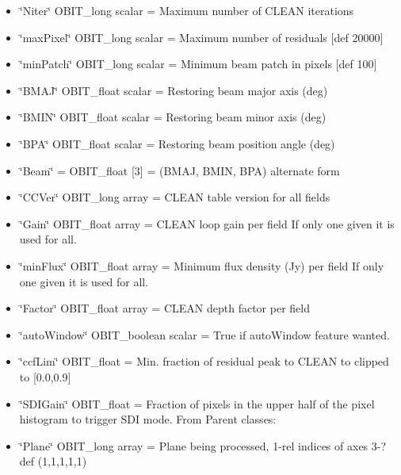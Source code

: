 \begin{itemize}
\item \char`\"{}Niter\char`\"{} OBIT\_\-long scalar = Maximum number of CLEAN iterations \item \char`\"{}max\-Pixel\char`\"{} OBIT\_\-long scalar = Maximum number of residuals [def 20000] \item \char`\"{}min\-Patch\char`\"{} OBIT\_\-long scalar = Minimum beam patch in pixels [def 100] \item \char`\"{}BMAJ\char`\"{} OBIT\_\-float scalar = Restoring beam major axis (deg) \item \char`\"{}BMIN\char`\"{} OBIT\_\-float scalar = Restoring beam minor axis (deg) \item \char`\"{}BPA\char`\"{} OBIT\_\-float scalar = Restoring beam position angle (deg) \item \char`\"{}Beam\char`\"{} = OBIT\_\-float [3] = (BMAJ, BMIN, BPA) alternate form \item \char`\"{}CCVer\char`\"{} OBIT\_\-long array = CLEAN table version for all fields \item \char`\"{}Gain\char`\"{} OBIT\_\-float array = CLEAN loop gain per field If only one given it is used for all. \item \char`\"{}min\-Flux\char`\"{} OBIT\_\-float array = Minimum flux density (Jy) per field If only one given it is used for all. \item \char`\"{}Factor\char`\"{} OBIT\_\-float array = CLEAN depth factor per field \item \char`\"{}auto\-Window\char`\"{} OBIT\_\-boolean scalar = True if auto\-Window feature wanted. \item \char`\"{}ccf\-Lim\char`\"{} OBIT\_\-float = Min. fraction of residual peak to CLEAN to clipped to [0.0,0.9] \item \char`\"{}SDIGain\char`\"{} OBIT\_\-float = Fraction of pixels in the upper half of the pixel histogram to trigger SDI mode. From Parent classes: \item \char`\"{}Plane\char`\"{} OBIT\_\-long array = Plane being processed, 1-rel indices of axes 3-? def (1,1,1,1,1) 
\end{itemize}
